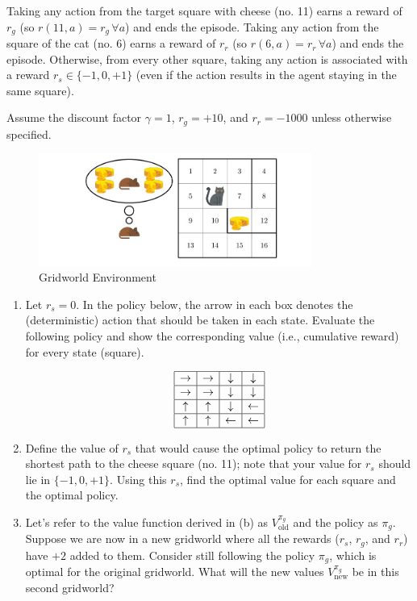 \documentclass[a3paper,12pt]{extarticle} %
\begin{document}
Taking any action from the target square with cheese (no. 11) earns a reward of $r_g$ (so $r(11, a) = r_g \, \forall a$) and ends the episode. Taking any action from the square of the cat (no. 6) earns a reward of $r_r$ (so $r(6, a) = r_r \, \forall a$) and ends the episode. Otherwise, from every other square, taking any action is associated with a reward $r_s \in \{-1, 0, +1\}$ (even if the action results in the agent staying in the same square). 

Assume the discount factor $\gamma = 1$, $r_g = +10$, and $r_r = -1000$ unless otherwise specified.

\begin{figure}[H]
\centering
\includegraphics[width=0.8\textwidth]{grid.jpg}
\caption{Gridworld Environment}
\label{fig:gridworld}
\end{figure}

\begin{enumerate}
   \item  Let $r_s = 0$. In the policy below, the arrow in each box denotes the (deterministic) action
    that should be taken in each state. Evaluate the following policy and show the corresponding value
    (i.e., cumulative reward) for every state (square).

    \[
    \begin{array}{|c|c|c|c|}
    \hline
    \rightarrow & \rightarrow & \downarrow & \downarrow \\
    \hline
    \rightarrow & \rightarrow & \downarrow & \downarrow \\
    \hline
    \uparrow & \uparrow & \downarrow & \leftarrow \\
    \hline
    \uparrow & \uparrow & \leftarrow & \leftarrow \\
    \hline
    \end{array}
    \]
    
    \item Define the value of $r_s$ that would cause the optimal policy to return the shortest path to the
    cheese square (no. 11); note that your value for $r_s$ should lie in $\{-1, 0, +1\}$. Using this $r_s$, find the
    optimal value for each square and the optimal policy.

    \item Let’s refer to the value function derived in (b) as $V^{\pi_g}_{\text{old}}$ and the policy as $\pi_g$. Suppose we are
    now in a new gridworld where all the rewards ($r_s$, $r_g$, and $r_r$) have $+2$ added to them. Consider still
    following the policy $\pi_g$, which is optimal for the original gridworld. What will the new values $V^{\pi_g}_{\text{new}}$ be
    in this second gridworld?
\end{enumerate}
\end{document}
